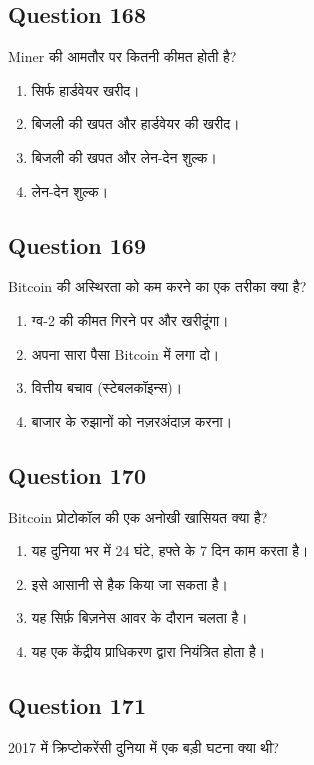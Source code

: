 \documentclass[12pt,a4paper]{article}
\begin{document}
\bigskip


\subsection*{Question 168}
Miner की आमतौर पर कितनी कीमत होती है?

\begin{enumerate}[label=\Alph*., leftmargin=*]
\item सिर्फ हार्डवेयर खरीद।
\item बिजली की खपत और हार्डवेयर की खरीद।
\item बिजली की खपत और लेन-देन शुल्क।
\item लेन-देन शुल्क।
\end{enumerate}

\bigskip


\subsection*{Question 169}
Bitcoin की अस्थिरता को कम करने का एक तरीका क्या है?

\begin{enumerate}[label=\Alph*., leftmargin=*]
\item ग्व-2 की कीमत गिरने पर और खरीदूंगा।
\item अपना सारा पैसा Bitcoin में लगा दो।
\item वित्तीय बचाव (स्टेबलकॉइन्स)।
\item बाजार के रुझानों को नज़रअंदाज़ करना।
\end{enumerate}

\bigskip


\subsection*{Question 170}
Bitcoin प्रोटोकॉल की एक अनोखी खासियत क्या है?

\begin{enumerate}[label=\Alph*., leftmargin=*]
\item यह दुनिया भर में 24 घंटे, हफ्ते के 7 दिन काम करता है।
\item इसे आसानी से हैक किया जा सकता है।
\item यह सिर्फ़ बिज़नेस आवर के दौरान चलता है।
\item यह एक केंद्रीय प्राधिकरण द्वारा नियंत्रित होता है।
\end{enumerate}

\bigskip


\subsection*{Question 171}
2017 में क्रिप्टोकरेंसी दुनिया में एक बड़ी घटना क्या थी?
\end{document}
